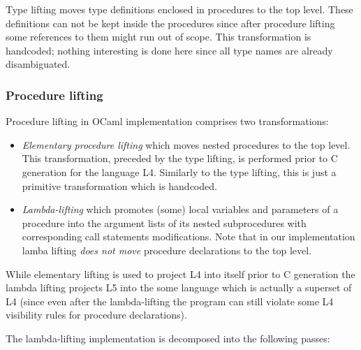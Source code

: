 Type lifting moves type definitions enclosed in procedures to the top level. These definitions can not be
kept inside the procedures since after procedure lifting some references to them might run out
of scope. This transformation is handcoded; nothing interesting is done here since all type names are 
already disambiguated.

\subsubsection{Procedure lifting}

Procedure lifting in OCaml implementation comprises two transformations:

\begin{itemize}
\item \emph{Elementary procedure lifting} which moves nested procedures to the top level. This transformation, 
preceded by the type lifting, is performed prior to C generation for the language L4. Similarly to the type 
lifting, this is just a primitive transformation which is handcoded.

\item \emph{Lambda-lifting} which promotes (some) local variables and parameters of a procedure into the
argument lists of its nested subprocedures with corresponding call statements modifications. Note that in
our implementation lamba lifting \emph{does not move} procedure declarations to the top level.
\end{itemize}

While elementary lifting is used to project L4 into itself prior to C generation the lambda lifting
projects L5 into the some language which is actually a superset of L4 (since even after the lambda-lifting 
the program can still violate some L4 visibility rules for procedure declarations). 

The lambda-lifting implementation is decomposed into the following passes:

